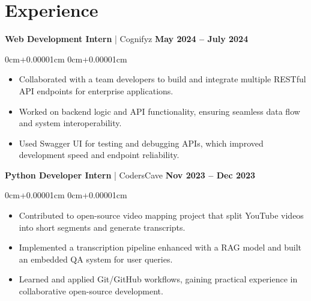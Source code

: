 \documentclass[10pt,a4paper]{article}
\newenvironment{highlights}{
    \begin{itemize}[
        topsep=0.10cm,
        parsep=0.10cm,
        partopsep=0pt,
        itemsep=0pt,
        leftmargin=10pt,
    ]
    }{
    \end{itemize}
}
\newenvironment{onecolentry}{
    \begin{adjustwidth}{
        0cm+0.00001cm
    }{
        0cm+0.00001cm
    }
    }{
    \end{adjustwidth}
}
\begin{document}
    \section{Experience}\label{sec:experience}

    \textbf{Web Development Intern} | Cognifyz \hfill \textbf{May 2024 – July 2024}
    \begin{onecolentry}
        \begin{highlights}
            \vspace{0.01cm}
            \item Collaborated with a team developers to build and integrate multiple RESTful API endpoints for enterprise applications.
            \item Worked on backend logic and API functionality, ensuring seamless data flow and system interoperability.
            \item Used Swagger UI for testing and debugging APIs, which improved development speed and endpoint reliability.
        \end{highlights}
    \end{onecolentry}
    \vspace{0.1cm}
    \textbf{Python Developer Intern} | CodersCave \hfill \textbf{Nov 2023 – Dec 2023}
    \begin{onecolentry}
        \begin{highlights}
            \vspace{0.01cm}
            \item Contributed to open-source video mapping project that split YouTube videos into short segments and generate transcripts.
            \item Implemented a transcription pipeline enhanced with a RAG model and built an embedded QA system for user queries.
            \item Learned and applied Git/GitHub workflows, gaining practical experience in collaborative open-source development.
        \end{highlights}
    \end{onecolentry}
\end{document}
